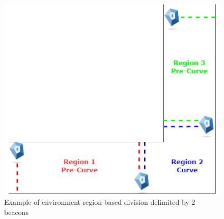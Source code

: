 \vspace{3mm}
\begin{figure}[H]
    \centering
    \includegraphics[width=0.9\columnwidth]{chapters/architecture/images/ble_beacons_regions.png}
    \caption{Example of environment region-based division delimited by 2 beacons}
\end{figure}
